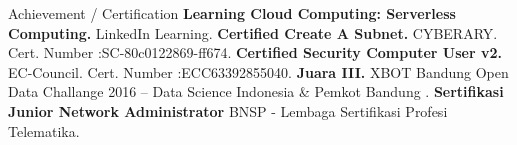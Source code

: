 \begin{rubric}{Achievement / Certification}
\entry*[2018]%
	\textbf{Learning Cloud Computing: Serverless Computing.} LinkedIn Learning.
%
\entry*[2017]%
	\textbf{Certified Create A Subnet.} CYBERARY. Cert. Number :SC-80c0122869-ff674.
%
\entry*[2017]%
	\textbf{Certified Security Computer User v2.} EC-Council. Cert. Number :ECC63392855040.
%
\entry*[2016]%
	\textbf{Juara III.} XBOT Bandung Open Data Challange 2016 – Data Science Indonesia \& Pemkot Bandung .
%
\entry*[2015]%
	\textbf{Sertifikasi Junior Network Administrator} BNSP - Lembaga Sertifikasi Profesi Telematika.
%
\end{rubric}